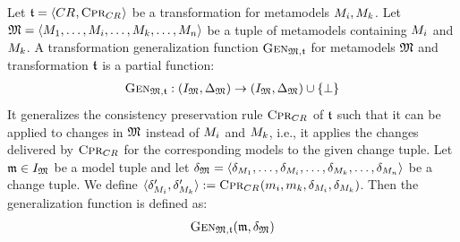 \begin{definition}
    Let $\mathfrak{t} = \langle CR_{}, \textsc{Cpr}_{CR_{}} \rangle$ be a transformation for metamodels $M_{i}, M_{k}$.
    Let $\mathfrak{M} = \langle M_{1}, \dots, M_{i}, \dots, M_{k}, \dots, M_{n} \rangle$ be a tuple of metamodels containing $M_{i}$ and $M_{k}$.
    A transformation generalization function $\textsc{Gen}_{\mathfrak{M},\mathfrak{t}}$ for metamodels $\mathfrak{M}$ and transformation $\mathfrak{t}$ is a partial function:
    \begin{align*}
        \textsc{Gen}_{\mathfrak{M},\mathfrak{t}} : (I_{\mathfrak{M}}, \Delta_{\mathfrak{M}}) \rightarrow (I_{\mathfrak{M}}, \Delta_{\mathfrak{M}}) \cup \{ \bot \}
    \end{align*}
    It generalizes the consistency preservation rule $\textsc{Cpr}_{CR_{}}$ of $\mathfrak{t}$ such that it can be applied to changes in $\mathfrak{M}$ instead of $M_{i}$ and $M_{k}$, i.e., it applies the changes delivered by $\textsc{Cpr}_{CR_{}}$ for the corresponding models to the given change tuple.
    Let $\mathfrak{m} \in I_{\mathfrak{M}}$ be a model tuple and let $\mathfrak{\delta}_{\mathfrak{M}} = \langle \delta_{M_{1}}, \dots, \delta_{M_{i}}, \dots, \delta_{M_{k}}, \dots, \delta_{M_{n}} \rangle$ be a change tuple.
    We define $\langle \delta_{M_{i}}', \delta_{M_{k}}' \rangle := \textsc{Cpr}_{CR_{}}(m_{i}, m_{k}, \delta_{M_{i}}, \delta_{M_{k}})$.
    Then the generalization function is defined as:
    \begin{align*}
        &
        \generalizationfunction{\metamodeltuple{M},\transformation{t}}(\modeltuple{m}, \changetuple{\metamodeltuple{M}}) \\

\end{align*}
\end{definition}
